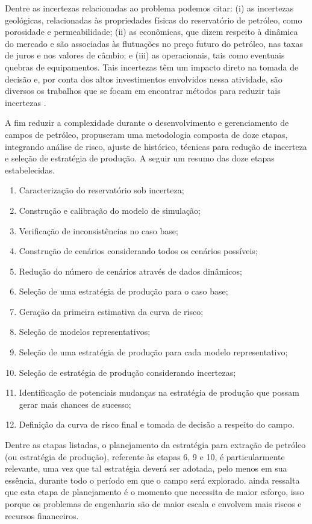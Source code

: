 Dentre as incertezas relacionadas ao problema podemos citar: (i) as incertezas geológicas, relacionadas às propriedades físicas do reservatório de petróleo, como porosidade e permeabilidade; (ii) as econômicas, que dizem respeito à dinâmica do mercado e são associadas às flutuações no preço futuro do petróleo, nas taxas de juros e nos valores de câmbio; e (iii) as operacionais, tais como eventuais quebras de equipamentos. Tais incertezas têm um impacto direto na tomada de decisão e, por conta dos altos investimentos envolvidos nessa atividade, são diversos os trabalhos que se focam em encontrar métodos para reduzir tais incertezas \cite{Oliveira2017,Maschio2010, Silva2012}.

A fim reduzir a complexidade durante o desenvolvimento e gerenciamento de campos de petróleo,  propuseram uma metodologia composta de doze etapas, integrando análise de risco, ajuste de histórico, técnicas para redução de incerteza e seleção de estratégia de produção. A seguir um resumo das doze etapas estabelecidas.

\begin{enumerate}
\item Caracterização do reservatório sob incerteza;
\item Construção e calibração do modelo de simulação;
\item Verificação de inconsistências no caso base;
\item Construção de cenários considerando todos os cenários possíveis;
\item Redução do número de cenários através de dados dinâmicos;
\item Seleção de uma estratégia de produção para o caso base;
\item Geração da primeira estimativa da curva de risco;
\item Seleção de modelos representativos;
\item Seleção de uma estratégia de produção para cada modelo representativo;
\item Seleção de estratégia de produção considerando incertezas;
\item Identificação de potenciais mudanças na estratégia de produção que possam gerar mais chances de sucesso;
\item Definição da curva de risco final e tomada de decisão a respeito do campo. 

\end{enumerate}

Dentre as etapas listadas, o planejamento da estratégia para extração de petróleo (ou estratégia de produção), referente às etapas 6, 9 e 10, é particularmente relevante, uma vez que tal estratégia deverá ser adotada, pelo menos em sua essência, durante todo o período em que o campo será explorado.  ainda ressalta que esta etapa de planejamento é o momento que necessita de maior esforço, isso porque os problemas de engenharia são de maior escala e envolvem mais riscos e recursos financeiros.

